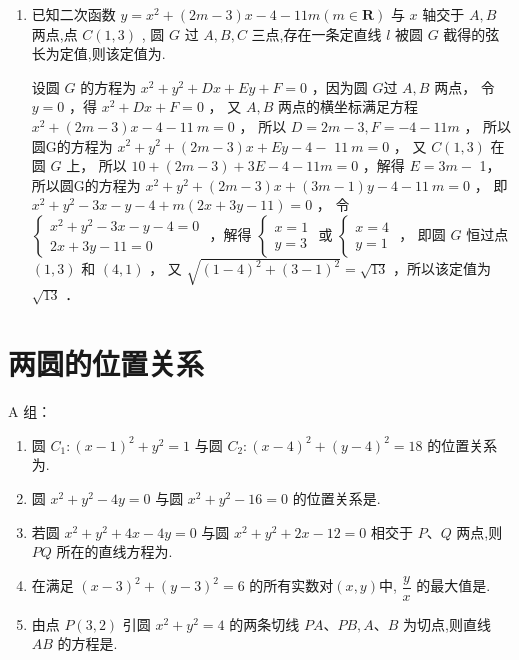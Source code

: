 \begin{enumerate}
    
    \item 已知二次函数 $y = {x}^{2} + \left( {{2m} - 3}\right) x - 4 - {11m}\left( {m \in  \mathbf{R}}\right)$ 与 $x$ 轴交于 $A,B$ 两点,点 $C\left( {1,3}\right)$ , 圆 $G$ 过 $A,B,C$ 三点,存在一条定直线 $l$ 被圆 $G$ 截得的弦长为定值,则该定值为.
    \begin{jieda}
        设圆 $G$ 的方程为 $x^2+y^2+D x+E y+F=0$ ，因为圆 $G$过 $A, B$ 两点，
令 $y=0$ ，得 $x^2+D x+F=0$ ，
又 $A, B$ 两点的横坐标满足方程 $x^2+(2 m-3) x-4- 11 {~m}=0$ ，
所以 $D=2 m-3, F=-4-11 m$ ，
所以圆G的方程为 $x^2+y^2+(2 m-3) x+E y-4-$
$11 {~m}=0$ ，
又 $C(1,3)$ 在圆 $G$ 上，
所以 $10+(2 m-3)+3 E-4-11 m=0$ ，解得 $E=3 m-$
1，
所以圆G的方程为 $x^2+y^2+(2 m-3) x+(3 m-1) y- 4-11 {~m}=0$ ，
即 $x^2+y^2-3 x-y-4+m(2 x+3 y-11)=0$ ，
令 $\left\{\begin{array}{l}x^2+y^2-3 x-y-4=0 \\ 2 x+3 y-11=0\end{array}\right.$ ，解得 $\left\{\begin{array}{l}x=1 \\ y=3\end{array}\right.$ 或 $\left\{\begin{array}{l}x=4 \\ y=1\end{array}\right.$ ，
即圆 $G$ 恒过点 $(1,3)$ 和 $(4,1)$ ，
又 $\sqrt{(1-4)^2+(3-1)^2}=\sqrt{13}$ ，所以该定值为 $\sqrt{13}$ ．
    \end{jieda}
    
\end{enumerate}


\section*{两圆的位置关系}

A 组：

\begin{enumerate}
    \item 圆 ${C}_{1} : {\left( x - 1\right) }^{2} + {y}^{2} = 1$ 与圆 ${C}_{2} : {\left( x - 4\right) }^{2} + {\left( y - 4\right) }^{2} = {18}$ 的位置关系为.

    \item 圆 ${x}^{2} + {y}^{2} - {4y} = 0$ 与圆 ${x}^{2} + {y}^{2} - {16} = 0$ 的位置关系是.

    \item 若圆 ${x}^{2} + {y}^{2} + {4x} - {4y} = 0$ 与圆 ${x}^{2} + {y}^{2} + {2x} - {12} = 0$ 相交于 $P\text{、}Q$ 两点,则 ${PQ}$ 所在的直线方程为.

    \item 在满足 ${\left( x - 3\right) }^{2} + {\left( y - 3\right) }^{2} = 6$ 的所有实数对$(x,y)$中, $\dfrac{y}{x}$ 的最大值是.

    \item 由点 $P\left( {3,2}\right)$ 引圆 ${x}^{2} + {y}^{2} = 4$ 的两条切线 ${PA}\text{、}{PB},A\text{、}B$ 为切点,则直线 ${AB}$ 的方程是.
    
\end{enumerate}

